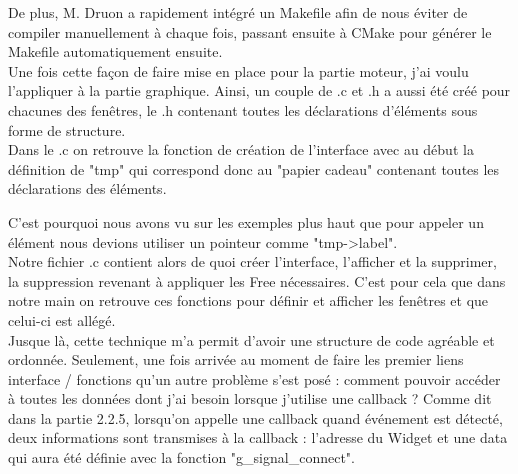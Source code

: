 \documentclass[11pt,french,a4paper]{report}
\begin{document}
De plus, M. Druon a rapidement intégré un Makefile afin de nous éviter de compiler manuellement à chaque fois, passant 
ensuite à CMake pour générer le Makefile automatiquement ensuite. \\
Une fois cette façon de faire mise en place pour la partie moteur, j'ai voulu l'appliquer à la partie
graphique. Ainsi, un couple de .c et .h a aussi été créé pour chacunes des fenêtres, le .h contenant 
toutes les déclarations d'éléments sous forme de structure. \\

Dans le .c on retrouve la fonction de création de l'interface avec au début la définition de "tmp" qui correspond donc 
au "papier cadeau" contenant toutes les déclarations des éléments. 

C'est pourquoi nous avons vu sur les exemples plus haut 
que pour appeler un élément nous devions utiliser un pointeur comme "tmp->label". \\

Notre fichier .c contient alors de quoi créer l'interface, l'afficher et la supprimer, la suppression revenant à appliquer les 
Free  nécessaires. C'est pour cela que dans notre main on retrouve ces fonctions pour définir et afficher les fenêtres 
et que celui-ci est allégé. \\

Jusque là, cette technique m'a permit d'avoir une structure de code agréable et ordonnée. Seulement, une fois arrivée au moment de 
faire les premier liens interface / fonctions qu'un autre problème s'est posé : comment pouvoir accéder à toutes les données
dont j'ai besoin lorsque j'utilise une callback ? 
Comme dit dans la partie 2.2.5, lorsqu'on appelle une callback quand événement est détecté, deux informations sont 
transmises à la callback : l'adresse du Widget et une data qui aura été définie avec la fonction "g\_signal\_connect". \\
\end{document}
